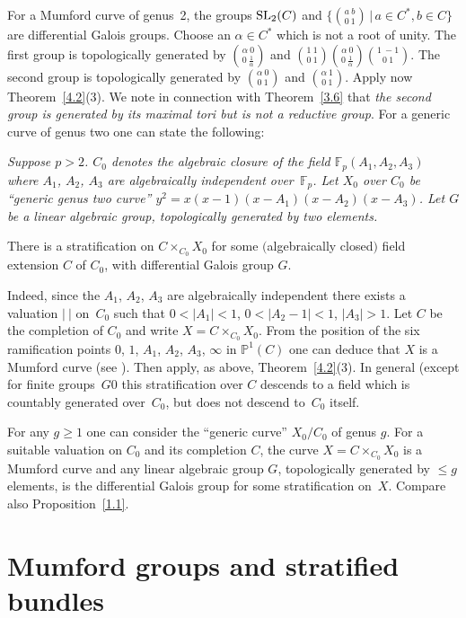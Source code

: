 \documentclass[10pt,a4paper]{amsart}
\numberwithin{equation}{section}
\begin{document}
\begin{Examples}\label{4.4} For a Mumford curve of genus~2, the groups ${\rm SL}_2(C)$ and $\big\{{a\ b \choose 0\ 1 }\,|\, a\in C^*,b\in C\big\}$ are differential Galois groups. Choose an $\alpha \in C^*$ which is not a root of unity. The first group is topologically generated by ${\alpha\ 0\choose 0\ \frac{1}{\alpha}}$ and ${1\ 1\choose 0\ 1 } {\alpha\ 0\choose 0\ \frac{1}{\alpha} }{1\ -1\choose 0\ 1 }$. The second group is topologically gene\-ra\-ted by ${\alpha\ 0\choose 0\ 1 }$ and ${\alpha \ 1\choose 0\ 1}$. Apply now Theorem~\ref{4.2}(3). We note in connection with Theorem~\ref{3.6} that {\it the second group is generated by its maximal tori but is not a reductive group}. For a generic curve of genus two one can state the following:

 {\it Suppose $p>2$. $C_0$ denotes the algebraic closure of the field $\mathbb{F}_p(A_1,A_2,A_3)$ where $A_1$, $A_2$, $A_3$ are algebraically independent over~$\mathbb{F}_p$. Let $X_0$ over $C_0$ be ``generic genus two curve'' $y^2=x(x-1)(x-A_1)(x-A_2)(x-A_3)$. Let $G$ be a linear algebraic group,
 topologically generated by two elements.

 There is a stratification on $C\times _{C_0}X_0$ for some $($algebraically closed$)$ field extension $C$ of $C_0$, with differential Galois group $G$.}

 Indeed, since the $A_1$, $A_2$, $A_3$ are algebraically independent there exists a valuation $| \ |$ on~$C_0$ such that $0<|A_1|<1$, $0<|A_2-1|<1$, $|A_3|>1$. Let $C$ be the completion of $C_0$ and write $X=C\times _{C_0}X_0$. From the position of the six ramification points $0$, $1$, $A_1$, $A_2$, $A_3$, $\infty$ in $\mathbb{P}^1(C)$ one can deduce that $X$ is a Mumford curve (see \cite[p.~168]{Ge-vdP}). Then apply, as above, Theorem~\ref{4.2}(3). In general (except for finite groups~$G$0 this stratification over $C$ descends to a field which is countably generated over~$C_0$, but does not descend to~$C_0$ itself.

 For any $g\geq 1$ one can consider the ``generic curve'' $X_0/C_0$ of genus $g$. For a suitable valuation on $C_0$ and its completion $C$, the curve $X=C\times_{C_0}X_0$ is a Mumford curve and any linear algebraic group $G$, topologically generated by $\leq g$ elements, is the differential Galois group for some stratification on~$X$. Compare also Proposition~\ref{1.1}.
 \end{Examples}

\section{Mumford groups and stratified bundles}\label{section5}
\end{document}
